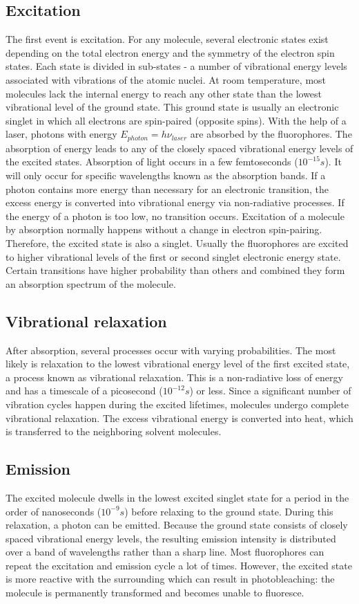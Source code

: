 \documentclass[twoside,single]{lion-msc}
\begin{document}
\subsection{Excitation}
The first event is excitation. For any molecule, several electronic states exist depending on the total electron energy and the symmetry of the electron spin states. Each state is divided in sub-states - a number of vibrational energy levels associated with vibrations of the atomic nuclei. At room temperature, most molecules lack the internal energy to reach any other state than the lowest vibrational level of the ground state. This ground state is usually an electronic singlet in which all electrons are spin-paired (opposite spins). With the help of a laser, photons with energy $E_{photon}=h \nu_{laser}$ are absorbed by the fluorophores. The absorption of energy leads to any of the closely spaced vibrational energy levels of the excited states. Absorption of light occurs in a few femtoseconds ($10^{-15}s$). It will only occur for specific wavelengths known as the absorption bands. If a photon contains more energy than necessary for an electronic transition, the excess energy is converted into vibrational energy via non-radiative processes. If the energy of a photon is too low, no transition occurs. Excitation of a molecule by absorption normally happens without a change in electron spin-pairing. Therefore, the excited state is also a singlet. Usually the fluorophores are excited to higher vibrational levels of the first or second singlet electronic energy state. Certain transitions have higher probability than others and combined they form an absorption spectrum of the molecule.

\subsection{Vibrational relaxation}
After absorption, several processes occur with varying probabilities. The most likely is relaxation to the lowest vibrational energy level of the first excited state, a process known as vibrational relaxation. This is a non-radiative loss of energy and has a timescale of a picosecond ($10^{-12}s$) or less. Since a significant number of vibration cycles happen during the excited lifetimes, molecules undergo complete vibrational relaxation. The excess vibrational energy is converted into heat, which is transferred to the neighboring solvent molecules.

\subsection{Emission}
The excited molecule dwells in the lowest excited singlet state for a period in the order of nanoseconds ($10^{-9}s$) before relaxing to the ground state. During this relaxation, a photon can be emitted. Because the ground state consists of closely spaced vibrational energy levels, the resulting emission intensity is distributed over a band of wavelengths rather than a sharp line. Most fluorophores can repeat the excitation and emission cycle a lot of times. However, the excited state is more reactive with the surrounding which can result in photobleaching: the molecule is permanently transformed and becomes unable to fluoresce. 
\end{document}
